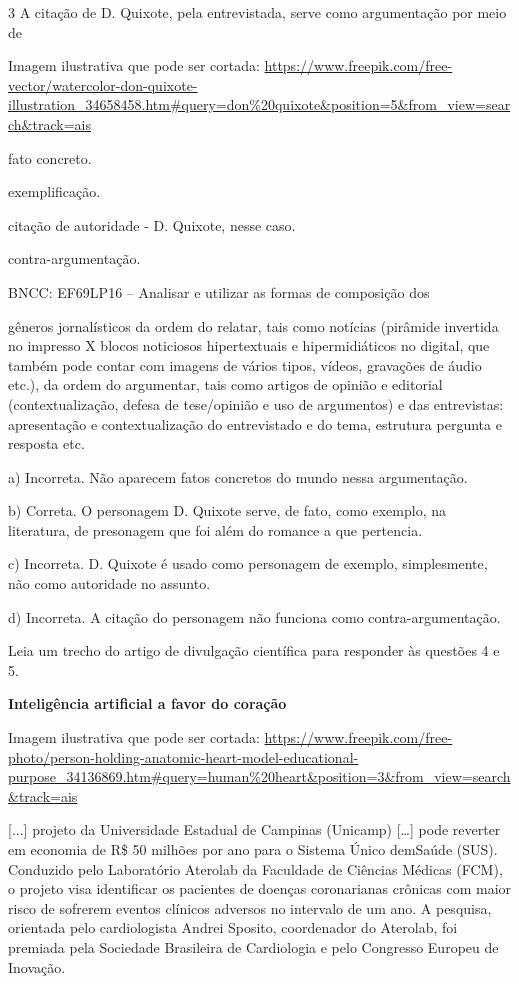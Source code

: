 \begin{escolha}
\begin{escolha}
\begin{escolha}
\begin{escolha}
\begin{escolha}
\num{3} A citação de D. Quixote, pela entrevistada, serve como
argumentação por meio de

Imagem ilustrativa que pode ser cortada:
\url{https://www.freepik.com/free-vector/watercolor-don-quixote-illustration_34658458.htm\#query=don\%20quixote\&position=5\&from_view=search\&track=ais}

\begin{escolha}
\item fato concreto.

\item exemplificação.

\item citação de autoridade - D. Quixote, nesse caso.

\item contra-argumentação.

\end{escolha}BNCC: EF69LP16 -- Analisar e utilizar as formas de composição dos

gêneros jornalísticos da ordem do relatar, tais como notícias (pirâmide
invertida no impresso X blocos noticiosos hipertextuais e
hipermidiáticos no digital, que também pode contar com imagens de vários
tipos, vídeos, gravações de áudio etc.), da ordem do argumentar, tais
como artigos de opinião e editorial (contextualização, defesa de
tese/opinião e uso de argumentos) e das entrevistas: apresentação e
contextualização do entrevistado e do tema, estrutura pergunta e
resposta etc.

a) Incorreta. Não aparecem fatos concretos do mundo nessa argumentação.

b) Correta. O personagem D. Quixote serve, de fato, como exemplo, na
literatura, de presonagem que foi além do romance a que pertencia.

c) Incorreta. D. Quixote é usado como personagem de exemplo,
simplesmente, não como autoridade no assunto.

d) Incorreta. A citação do personagem não funciona como
contra-argumentação.

Leia um trecho do artigo de divulgação científica para responder às
questões 4 e 5.

\textbf{Inteligência artificial a favor do coração}

Imagem ilustrativa que pode ser cortada:
\url{https://www.freepik.com/free-photo/person-holding-anatomic-heart-model-educational-purpose_34136869.htm\#query=human\%20heart\&position=3\&from_view=search\&track=ais}

{[}...{]} projeto da Universidade Estadual de Campinas (Unicamp)
{[}\ldots{}{]} pode reverter em economia de R\$ 50 milhões por ano para
o Sistema Único demSaúde (SUS). Conduzido pelo Laboratório Aterolab da
Faculdade de Ciências Médicas (FCM), o projeto visa identificar os
pacientes de doenças coronarianas crônicas com maior risco de sofrerem
eventos clínicos adversos no intervalo de um ano. A pesquisa, orientada
pelo cardiologista Andrei Sposito, coordenador do Aterolab, foi premiada
pela Sociedade Brasileira de Cardiologia e pelo Congresso Europeu de
Inovação.


\end{escolha}
\end{escolha}
\end{escolha}
\end{escolha}
\end{escolha}
